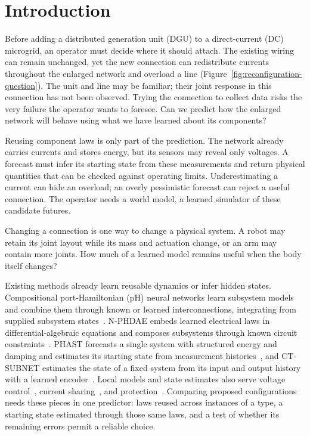 \section{Introduction}
\label{sec:intro}

Before adding a distributed generation unit (DGU) to a direct-current (DC) microgrid, an operator must decide where it should attach.
The existing wiring can remain unchanged, yet the new connection can redistribute currents throughout the enlarged network and overload a line (Figure~\ref{fig:reconfiguration-question}).
The unit and line may be familiar; their joint response in this connection has not been observed.
Trying the connection to collect data risks the very failure the operator wants to foresee.
Can we predict how the enlarged network will behave using what we have learned about its components?

Reusing component laws is only part of the prediction.
The network already carries currents and stores energy, but its sensors may reveal only voltages.
A forecast must infer its starting state from these measurements and return physical quantities that can be checked against operating limits.
Underestimating a current can hide an overload; an overly pessimistic forecast can reject a useful connection.
The operator needs a world model, a learned simulator of these candidate futures.

\label{sec:intro:study-questions}
Changing a connection is one way to change a physical system.
A robot may retain its joint layout while its mass and actuation change, or an arm may contain more joints.
How much of a learned model remains useful when the body itself changes?

Existing methods already learn reusable dynamics or infer hidden states.
Compositional port-Hamiltonian (pH) neural networks learn subsystem models and combine them through known or learned interconnections, integrating from supplied subsystem states~\citep{neary2023compositional}.
N-PHDAE embeds learned electrical laws in differential-algebraic equations and composes subsystems through known circuit constraints~\citep{neary2024nphdae}.
PHAST forecasts a single system with structured energy and damping and estimates its starting state from measurement histories~\citep{phast2025}, and CT-SUBNET estimates the state of a fixed system from its input and output history with a learned encoder~\citep{beintema2023ctsubnet}.
Local models and state estimates also serve voltage control~\citep{tucci2016lineindependent,sadabadi2018plugandplay}, current sharing~\citep{cucuzzella2018robust}, and protection~\citep{liu2018protection}.
Comparing proposed configurations needs these pieces in one predictor: laws reused across instances of a type, a starting state estimated through those same laws, and a test of whether its remaining errors permit a reliable choice.

